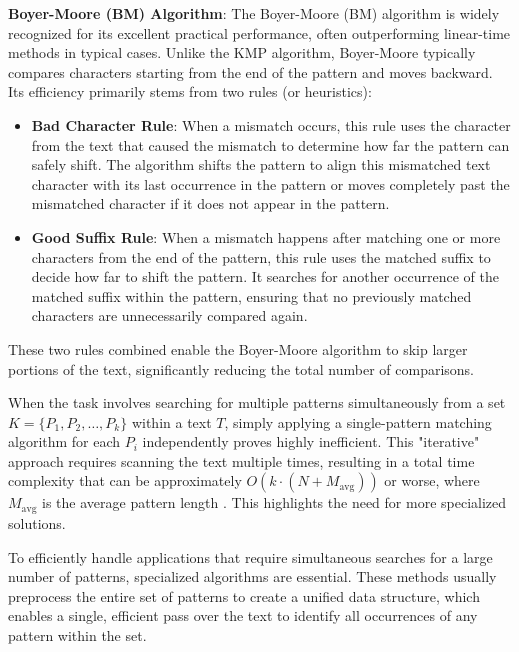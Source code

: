 \textbf{Boyer-Moore (BM) Algorithm}: The Boyer-Moore (BM) algorithm \cite{BoyerMoore1977} is widely recognized for its excellent practical performance, often outperforming linear-time methods in typical cases. Unlike the KMP algorithm, Boyer-Moore typically compares characters starting from the end of the pattern and moves backward.
Its efficiency primarily stems from two rules (or heuristics):
\begin{itemize}
    \item \textbf{Bad Character Rule}: When a mismatch occurs, this rule uses the character from the text that caused the mismatch to determine how far the pattern can safely shift. The algorithm shifts the pattern to align this mismatched text character with its last occurrence in the pattern or moves completely past the mismatched character if it does not appear in the pattern.
    \item \textbf{Good Suffix Rule}: When a mismatch happens after matching one or more characters from the end of the pattern, this rule uses the matched suffix to decide how far to shift the pattern. It searches for another occurrence of the matched suffix within the pattern, ensuring that no previously matched characters are unnecessarily compared again.
\end{itemize}
These two rules combined enable the Boyer-Moore algorithm to skip larger portions of the text, significantly reducing the total number of comparisons.


When the task involves searching for multiple patterns simultaneously from a set $K = \{P_1, P_2, \dots, P_k\}$ within a text $T$, simply applying a single-pattern matching algorithm for each $P_i$ independently proves highly inefficient. This "iterative" approach requires scanning the text multiple times, resulting in a total time complexity that can be approximately $O(k \cdot (N+M_{\text{avg}}))$ or worse, where $M_{\text{avg}}$ is the average pattern length \cite{AhoCorasick1975}. This highlights the need for more specialized solutions.


To efficiently handle applications that require simultaneous searches for a large number of patterns, specialized algorithms are essential. These methods usually preprocess the entire set of patterns to create a unified data structure, which enables a single, efficient pass over the text to identify all occurrences of any pattern within the set.

